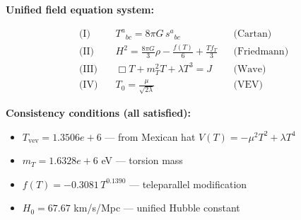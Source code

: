 
\textbf{Unified field equation system:}

\begin{align}
  \text{(I)} \quad & T^a{}_{bc} = 8\pi G \, s^a{}_{bc} && \text{(Cartan)} \\
  \text{(II)} \quad & H^2 = \frac{8\pi G}{3}\rho - \frac{f(T)}{6} + \frac{Tf_T}{3} && \text{(Friedmann)} \\
  \text{(III)} \quad & \Box T + m_T^2 T + \lambda T^3 = J && \text{(Wave)} \\
  \text{(IV)} \quad & T_0 = \frac{\mu}{\sqrt{2\lambda}} && \text{(VEV)}
\end{align}

\textbf{Consistency conditions (all satisfied):}
\begin{itemize}
  \item $T_{\text{vev}} = 1.3506e+6$ — from Mexican hat $V(T) = -\mu^2 T^2 + \lambda T^4$
  \item $m_T = 1.6328e+6$ eV — torsion mass
  \item $f(T) = -0.3081 \, T^{0.1390}$ — teleparallel modification
  \item $H_0 = 67.67$ km/s/Mpc — unified Hubble constant
\end{itemize}